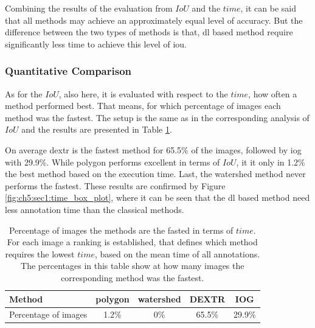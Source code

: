 Combining the results of the evaluation from $ IoU $ and the $ time $, it can be said that all methods may achieve an approximately equal level of accuracy.
But the difference between the two types of methods is that, \gls{dl} based method require significantly less time to achieve this level of \gls{iou}.



\subsubsection{Quantitative Comparison}

As for the $ IoU $, also here, it is evaluated with respect to the $ time $, how often a method performed best. 
That means, for which percentage of images each method was the fastest.
The setup is the same as in the corresponding analysis of $ IoU $ and the results are presented in Table \ref{tab:ch5:best_performance_time}.

On average \gls{dextr} is the fastest method for 65.5\% of the images, followed by \gls{iog} with 29.9\%.
While polygon performs excellent in terms of $ IoU $, it it only in 1.2\% the best method based on the execution time.
Last, the watershed method never performs the fastest.
These results are confirmed by Figure \ref{fig:ch5:sec1:time_box_plot}, where it can be seen that the \gls{dl} based method need less annotation time than the classical methods.

\begin{table}[h!]
	\centering
	\begin{tabular}{l|c c c c}
		Method					& polygon 	& watershed & DEXTR 	& IOG  		\\
		\hline
		Percentage of images 	& 1.2\%		& 0\% 		& 65.5\% 	& 29.9\% 	\\
	\end{tabular}
	\caption[Method's best performance on $ time $]{
		Percentage of images the methods are the fasted in terms of $ time $.
		For each image a ranking is established, that defines which method requires the lowest $ time $, based on the mean time of all annotations.
		The percentages in this table show at how many images the corresponding method was the fastest.
	} \label{tab:ch5:best_performance_time}
\end{table}

